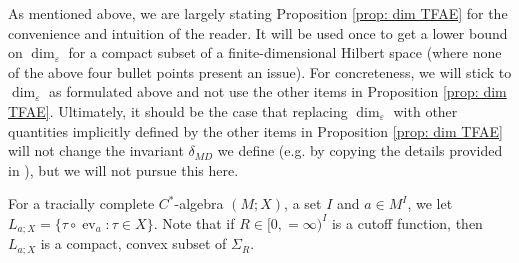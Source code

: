\documentclass[10pt]{amsart}
\theoremstyle{definition}
\numberwithin{equation}{section}
\DeclareMathOperator{\ev}{ev}
\begin{document}
As mentioned above, we are largely stating Proposition \ref{prop: dim TFAE} for the convenience and intuition of the reader. It will be used once to get a lower bound on $\dim_{\varepsilon}$ for a compact subset of a finite-dimensional Hilbert space (where none of the above four bullet points present an issue). For concreteness, we will stick to $\dim_{\varepsilon}$ as formulated above and not use the other items in Proposition \ref{prop: dim TFAE}. Ultimately, it should be the case that replacing $\dim_{\varepsilon}$ with other quantities implicitly defined by the other items in Proposition \ref{prop: dim TFAE} will not change the invariant $\delta_{MD}$ we define (e.g. by copying the details provided in \cite[Section 1.1]{UWEquiv}), but we will not pursue this here. 

For a tracially complete $C^{*}$-algebra $(M;X)$, a set $I$ and $a\in M^{I}$, we let $L_{a;X}=\{\tau\circ \ev_{a}:\tau\in X\}$. Note that if $R\in [0,=\infty)^{I}$ is a cutoff function, then $L_{a;X}$ is a compact, convex subset of $\Sigma_{R}$. 
\end{document}
